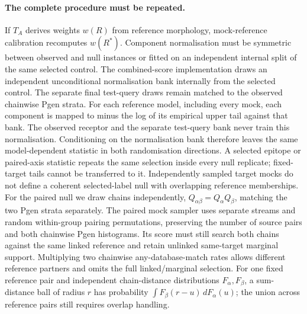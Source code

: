 \documentclass[10pt,a4paper]{article}
\theoremstyle{definition}
\begin{document}
\paragraph{The complete procedure must be repeated.}
If $T_A$ derives weights $w(R)$ from reference morphology, mock-reference calibration recomputes $w(R^*)$.
Component normalisation must be symmetric between observed and null instances or fitted on an independent internal split of the same selected control.
The combined-score implementation draws an independent unconditional normalisation bank internally from the selected control.
The separate final test-query draws remain matched to the observed chainwise Pgen strata.
For each reference model, including every mock, each component is mapped to minus the log of its empirical upper tail against that bank.
The observed receptor and the separate test-query bank never train this normalisation.
Conditioning on the normalisation bank therefore leaves the same model-dependent statistic in both randomisation directions.
A selected epitope or paired-axis statistic repeats the same selection inside every null replicate; fixed-target tails cannot be transferred to it.
Independently sampled target mocks do not define a coherent selected-label null with overlapping reference memberships.
For the paired null we draw chains independently, $Q_{\alpha\beta}=Q_\alpha Q_\beta$, matching the two Pgen strata separately.
The paired mock sampler uses separate streams and random within-group pairing permutations, preserving the number of source pairs and both chainwise Pgen histograms.
Its score must still search both chains against the same linked reference and retain unlinked same-target marginal support.
Multiplying two chainwise any-database-match rates allows different reference partners and omits the full linked/marginal selection.
For one fixed reference pair and independent chain-distance distributions $F_\alpha,F_\beta$, a sum-distance ball of radius $r$ has probability $\int F_\beta(r-u)\,dF_\alpha(u)$; the union across reference pairs still requires overlap handling.
\end{document}
